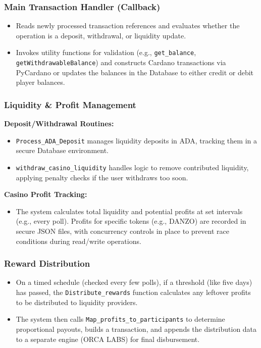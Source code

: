 \documentclass[11pt,a4paper]{article}
\begin{document}
\subsubsection{Main Transaction Handler (Callback)}
\begin{itemize}
    \item Reads newly processed transaction references and evaluates whether the operation is a deposit, withdrawal, or liquidity update.
    \item Invokes utility functions for validation (e.g., \texttt{get\_balance}, \texttt{getWithdrawableBalance}) and constructs Cardano transactions via PyCardano or updates the balances in the Database to either credit or debit player balances.
\end{itemize}

\subsubsection{Liquidity \& Profit Management}
\textbf{Deposit/Withdrawal Routines:}
\begin{itemize}
    \item \texttt{Process\_ADA\_Deposit} manages liquidity deposits in ADA, tracking them in a secure Database environment.
    \item \texttt{withdraw\_casino\_liquidity} handles logic to remove contributed liquidity, applying penalty checks if the user withdraws too soon.
\end{itemize}

\textbf{Casino Profit Tracking:}
\begin{itemize}
    \item The system calculates total liquidity and potential profits at set intervals (e.g., every poll). Profits for specific tokens (e.g., DANZO) are recorded in secure JSON files, with concurrency controls in place to prevent race conditions during read/write operations.
\end{itemize}

\subsubsection{Reward Distribution}
\begin{itemize}
    \item On a timed schedule (checked every few polls), if a threshold (like five days) has passed, the \texttt{Distribute\_rewards} function calculates any leftover profits to be distributed to liquidity providers.
    \item The system then calls \texttt{Map\_profits\_to\_participants} to determine proportional payouts, builds a transaction, and appends the distribution data to a separate engine (ORCA LABS) for final disbursement.
\end{itemize}
\end{document}
